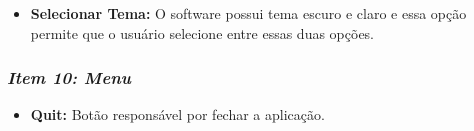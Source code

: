 \begin{itemize}
        \setlength{\itemsep}{-2pt}
	\item \textbf{Selecionar Tema:} O software possui tema escuro e claro e essa opção permite que o usuário selecione entre essas duas opções.
\end{itemize}


\subsubsection*{\textit{Item 10: Menu}}

\begin{itemize}
        \setlength{\itemsep}{-2pt}
	\item \textbf{Quit:} Botão responsável por fechar a aplicação.
\end{itemize}

